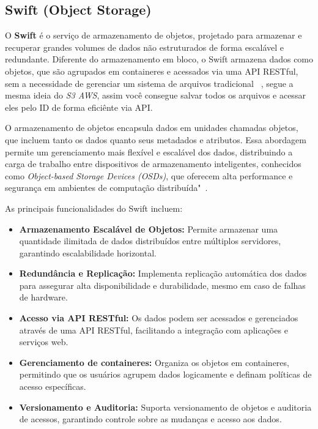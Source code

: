 \subsection{Swift (Object Storage)}

O \textbf{Swift} é o serviço de armazenamento de objetos, projetado para armazenar e recuperar grandes volumes de dados não estruturados de forma escalável e redundante. Diferente do armazenamento em bloco, o Swift armazena dados como objetos, que são agrupados em containeres e acessados via uma API RESTful, sem a necessidade de gerenciar um sistema de arquivos tradicional ~\citep{OpenStackSwitft}, segue a mesma ideia do \textit{S3 AWS}, assim você consegue salvar todos os arquivos e acessar eles pelo ID de forma eficiênte via API.

O armazenamento de objetos encapsula dados em unidades chamadas objetos, que incluem tanto os dados quanto seus metadados e atributos. Essa abordagem permite um gerenciamento mais flexível e escalável dos dados, distribuindo a carga de trabalho entre dispositivos de armazenamento inteligentes, conhecidos como \textit{Object-based Storage Devices (OSDs)}, que oferecem alta performance e segurança em ambientes de computação distribuída"~\citep{panasas2007object}.

As principais funcionalidades do Swift incluem:

\begin{itemize}
    \item \textbf{Armazenamento Escalável de Objetos:} Permite armazenar uma quantidade ilimitada de dados distribuídos entre múltiplos servidores, garantindo escalabilidade horizontal.
    \item \textbf{Redundância e Replicação:} Implementa replicação automática dos dados para assegurar alta disponibilidade e durabilidade, mesmo em caso de falhas de hardware.
    \item \textbf{Acesso via API RESTful:} Os dados podem ser acessados e gerenciados através de uma API RESTful, facilitando a integração com aplicações e serviços web.
    \item \textbf{Gerenciamento de containeres:} Organiza os objetos em containeres, permitindo que os usuários agrupem dados logicamente e definam políticas de acesso específicas.
    \item \textbf{Versionamento e Auditoria:} Suporta versionamento de objetos e auditoria de acessos, garantindo controle sobre as mudanças e acesso aos dados.
\end{itemize}

